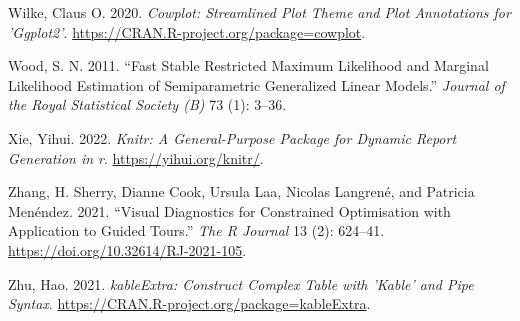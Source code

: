 \documentclass[
]{article}
\newlength{\cslhangindent}
\newlength{\cslentryspacingunit} %
\newenvironment{CSLReferences}[2] %
 {%
  \setlength{\parindent}{0pt}
  \ifodd #1
  \let\oldpar\par
  \def\par{\hangindent=\cslhangindent\oldpar}
  \fi
  \setlength{\parskip}{#2\cslentryspacingunit}
 }%
 {}
\begin{document}
\begin{CSLReferences}{1}{0}
\leavevmode{}%
Wilke, Claus O. 2020. \emph{Cowplot: Streamlined Plot Theme and Plot
Annotations for 'Ggplot2'}.
\url{https://CRAN.R-project.org/package=cowplot}.

\leavevmode{}%
Wood, S. N. 2011. {``Fast Stable Restricted Maximum Likelihood and
Marginal Likelihood Estimation of Semiparametric Generalized Linear
Models.''} \emph{Journal of the Royal Statistical Society (B)} 73 (1):
3--36.

\leavevmode{}%
Xie, Yihui. 2022. \emph{Knitr: A General-Purpose Package for Dynamic
Report Generation in r}. \url{https://yihui.org/knitr/}.

\leavevmode{}%
Zhang, H. Sherry, Dianne Cook, Ursula Laa, Nicolas Langrené, and
Patricia Menéndez. 2021. {``Visual Diagnostics for Constrained
Optimisation with Application to Guided Tours.''} \emph{The R Journal}
13 (2): 624--41. \url{https://doi.org/10.32614/RJ-2021-105}.

\leavevmode{}%
Zhu, Hao. 2021. \emph{kableExtra: Construct Complex Table with 'Kable'
and Pipe Syntax}. \url{https://CRAN.R-project.org/package=kableExtra}.

\end{CSLReferences}
\end{document}
